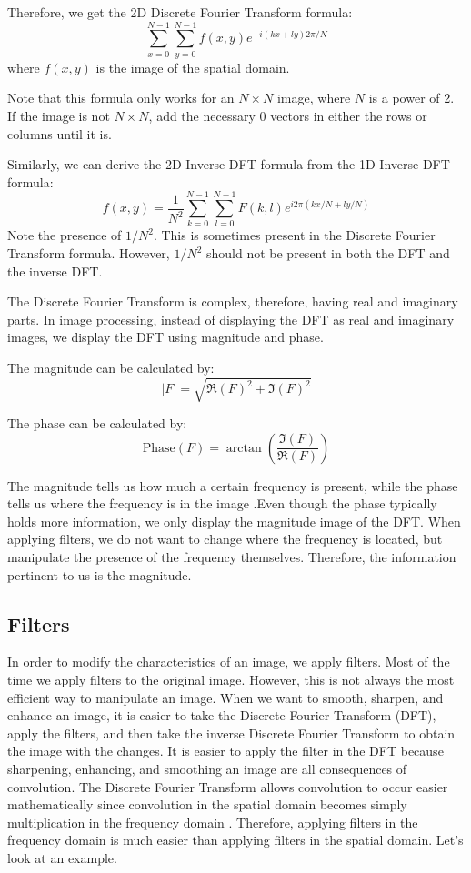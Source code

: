 \documentclass [../article.tex]{subfiles}
\begin{document}
  Therefore, we get the 2D Discrete Fourier
  Transform formula:
  \[\sum_{x=0}^{N-1}\sum_{y=0}^{N-1}f(x,y)e^{-i(kx+ly)2\pi/N}\]
  where $f(x,y)$ is the image of the spatial domain.

  Note that this formula only works for an $N \times N$ image,
  where $N$ is a power of 2. If the image is not $N \times N$,
  add the necessary 0 vectors in either the rows or columns
  until it is.

  Similarly, we can derive the 2D Inverse DFT formula from the
  1D Inverse DFT formula:
  \[f(x,y) = \frac{1}{N^2}\sum_{k=0}^{N-1}\sum_{l=0}^{N-1}
    F(k,l)e^{i2\pi(kx/N+ly/N)}\]
  Note the presence of $1/N^2$. This is sometimes present
  in the Discrete Fourier Transform formula. However,
  $1/N^2$ should not be present in both the DFT and the
  inverse DFT.

  The Discrete Fourier Transform is complex, therefore, having
  real and imaginary parts.  In image processing, instead of
  displaying the DFT as real and imaginary images, we display
  the DFT using magnitude and phase.

  The magnitude can be calculated by:
  \[|F| = \sqrt{\Re(F)^2 + \Im(F)^2}\]

  The phase can be calculated by:
  \[\text{Phase}(F) = \arctan\left(
  \frac{\Im (F)}{\Re (F)}\right)\]

  The magnitude tells us how much a certain frequency is present,
  while the phase tells us where the frequency is in the image
  \cite{brayer}.Even though the phase typically holds more
  information, we only display the magnitude image of the DFT.
  When applying filters, we do not want to change where the
  frequency is located, but manipulate the presence of the
  frequency themselves.  Therefore, the information pertinent
  to us is the magnitude.

  \subsection{Filters}

  In order to modify the characteristics of an image, we apply
  filters. Most of the time we apply filters to the original
  image. However, this is not always the most efficient way to
  manipulate an image. When we want to smooth, sharpen, and enhance
  an image, it is easier to take the Discrete Fourier Transform (DFT),
  apply the filters, and then take the inverse Discrete Fourier
  Transform to obtain the image with the changes\cite{ludwig}.  It
  is easier to apply the filter in the DFT because sharpening, enhancing, and smoothing an image are all consequences of convolution.  The Discrete Fourier Transform allows convolution to occur easier mathematically since convolution in the spatial domain becomes simply multiplication in the frequency domain \cite{smith_1997}. Therefore, applying filters in the frequency domain is much easier than applying filters in the spatial domain.
  Let's look at an example.
\end{document}
